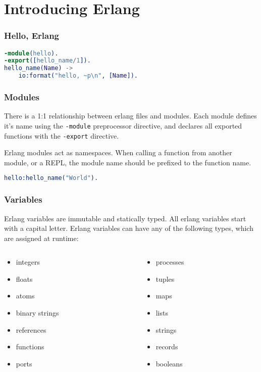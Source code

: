 \documentclass{beamer}
\begin{document}
\section{Introducing Erlang}

\begin{frame}[fragile]
  \frametitle{Hello, Erlang}
\begin{lstlisting}[language=erlang]
-module(hello).
-export([hello_name/1]).
hello_name(Name) ->
    io:format("hello, ~p\n", [Name]).
\end{lstlisting}
\end{frame}

\begin{frame}[fragile]
  \frametitle{Modules}
  There is a 1:1 relationship between erlang files and modules.  Each
  module defines it's name using the \verb!-module! preprocessor
  directive, and declares all exported functions with the
  \verb!-export! directive.

  Erlang modules act as namespaces.  When calling a function from
  another module, or a REPL, the module name should be prefixed to the
  function name.

\begin{lstlisting}[language=erlang]
hello:hello_name("World").
\end{lstlisting}
\end{frame}

\begin{frame}
  \frametitle{Variables}
  Erlang variables are immutable and statically typed.  All erlang
  variables start with a capital letter.  Erlang variables can have
  any of the following types, which are assigned at runtime:
  \begin{columns}
    \begin{column}{0.5\textwidth}
      \begin{itemize}
      \item integers
      \item floats
      \item atoms
      \item binary strings
      \item references
      \item functions
      \item ports
      \end{itemize}
    \end{column}
    \begin{column}{0.5\textwidth}
      \begin{itemize}
      \item processes
      \item tuples
      \item maps
      \item lists
      \item strings
      \item records
      \item booleans
      \end{itemize}
    \end{column}
  \end{columns}
\end{frame}
\end{document}
